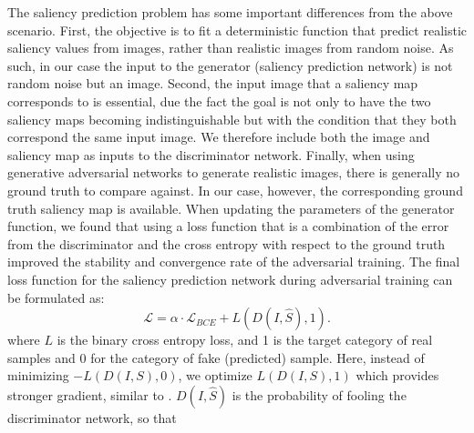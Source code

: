\documentclass[times,twocolumn,final,authoryear]{elsarticle}
\begin{document}
The saliency prediction problem has some important differences from the above scenario. First, the objective is to fit a deterministic function that predict realistic saliency values from images, rather than realistic images from random noise. As such, in our case the input to the generator (saliency prediction network) is not random noise but an image. Second, the input image that a saliency map corresponds to is essential, due the fact the goal is not only to have the two saliency maps becoming indistinguishable but with the condition that they both correspond the same input image. We therefore include both the image and saliency map as inputs to the discriminator network. Finally, when using generative adversarial networks to generate realistic images, there is generally no ground truth to compare against. In our case, however, the corresponding ground truth saliency map is available. When updating the parameters of the generator function, we found that using a loss function that is a combination of the error from the discriminator and the cross entropy with respect to the ground truth improved the stability and convergence rate of the adversarial training.
The final loss function for the saliency prediction network during adversarial training can be formulated as:
\begin{equation}
\mathcal{L} =
\alpha \cdotp \mathcal{L}_{BCE} +
L( D(I,\hat{S}), 1).
\label{eq:alpha}
\end{equation}
%
where $L$ is the binary cross entropy loss, and 1 is the target category of real samples and 0 for the category of fake (predicted) sample.  Here,  instead of minimizing $-L( D(I,S), 0)$, we optimize  $L( D(I,S), 1)$ which provides stronger gradient, similar to \citep{goodfellow2014generative} .
$D(I,\hat{S})$ is the probability of fooling the discriminator network, so that
\end{document}
